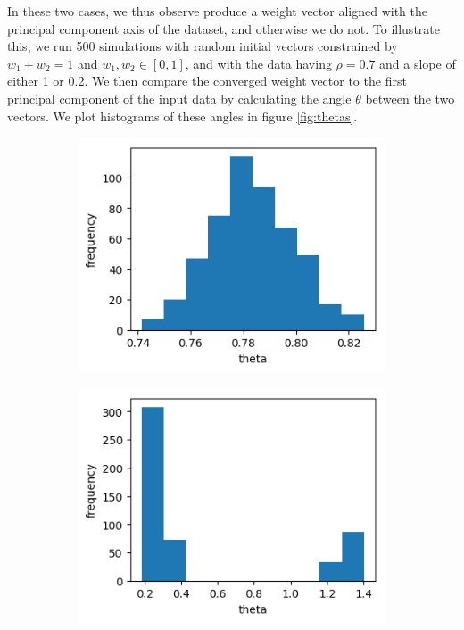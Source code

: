 \documentclass{article}
\begin{document}
In these two cases, we thus observe produce a weight vector aligned with the principal component axis of the dataset, and otherwise we do not.
To illustrate this, we run 500 simulations with random initial vectors constrained by $w_1 + w_2 = 1$ and $w_1, w_2 \in [0,1]$, and with the data having $\rho = 0.7$ and a slope of either 1 or 0.2. We then compare the converged weight vector to the first principal component of the input data by calculating the angle $\theta$ between the two vectors. We plot histograms of these angles in figure \ref{fig:thetas}.

\begin{figure}[h]
	\centering
	\begin{subfigure}[t]{0.28\linewidth}
		\centering
		\includegraphics[width = 1.0\linewidth, trim={5 5 5 5}, clip=true]{figures/rho7_slope1_hist.png}
	\end{subfigure}%
	\hspace{0.1\linewidth}
	\begin{subfigure}[t]{0.28\linewidth}
		\centering
		\includegraphics[width = 1.0\linewidth, trim={5 5 5 5}, clip=true]{figures/rho7_slope02_hist.png}

\end{subfigure}
\end{figure}
\end{document}
